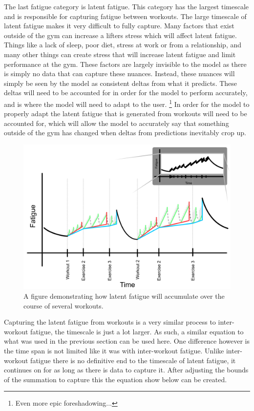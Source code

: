 The last fatigue category is latent fatigue. This category has the largest timescale and is responsible for capturing fatigue between workouts. The large timescale of latent fatigue makes it very difficult to fully capture. Many factors that exist outside of the gym can increase a lifters stress which will affect latent fatigue. Things like a lack of sleep, poor diet, stress at work or from a relationship, and many other things can create stress that will increase latent fatigue and limit performance at the gym. These factors are largely invisible to the model as there is simply no data that can capture these nuances. Instead, these nuances will simply be seen by the model as consistent deltas from what it predicts. These deltas will need to be accounted for in order for the model to perform accurately, and is where the model will need to adapt to the user. \footnote{Even more epic foreshadowing...} In order for the model to properly adapt the latent fatigue that is generated from workouts will need to be accounted for, which will allow the model to accurately say that something outside of the gym has changed when deltas from predictions inevitably crop up.

\begin{figure}[htb]
    \centering
    \includegraphics[scale=0.55]{images/ch2/LatentFatigue.png}
    \caption{A figure demonstrating how latent fatigue will accumulate over the course of several workouts.}
    \label{fig:P2C1_LatentFatigue}
\end{figure}

Capturing the latent fatigue from workouts is a very similar process to inter-workout fatigue, the timescale is just a lot larger. As such, a similar equation to what was used in the previous section can be used here. One difference however is the time span is not limited like it was with inter-workout fatigue. Unlike inter-workout fatigue there is no definitive end to the timescale of latent fatigue, it continues on for as long as there is data to capture it. After adjusting the bounds of the summation to capture this the equation show below can be created.

